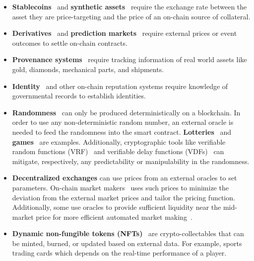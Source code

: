 \begin{itemize}

\item \textbf{Stablecoins}~\cite{clark2019sok,MSS20,PHP+19,gu2020empirical,MAKERDAOOracle} and \textbf{synthetic assets}~\cite{SCM21} require the exchange rate between the asset they are price-targeting and the price of an on-chain source of collateral. 
\item \textbf{Derivatives}~\cite{eskandari2017feasibility,biryukov2017findel,synthetix} and \textbf{prediction markets}~\cite{clark2014decentralizing,peterson2015augur} require external prices or event outcomes to settle on-chain contracts.
\item \textbf{Provenance systems}~\cite{RKYCC19,tian2016agri} require tracking information of real world assets like gold, diamonds, mechanical parts, and shipments.
\item \textbf{Identity}~\cite{KL17,maram2021candid} and other on-chain reputation systems require knowledge of governmental records to establish identities.
\item \textbf{Randomness}~\cite{chainlinkvrf} can only be produced deterministically on a blockchain. In order to use any non-deterministic random number, an external oracle is needed to feed the randomness into the smart contract. \textbf{Lotteries}~\cite{pooltogether} and \textbf{games}~\cite{etheroll} are examples. Additionally, cryptographic tools like verifiable random functions (VRF)~\cite{micali1999verifiable,goldbe-vrf-01} and verifiable delay functions (VDFs)~\cite{bunz2017proofs,crypto-2018-28858} can mitigate, respectively, any predictability or manipulability in the randomness.
\item \textbf{Decentralized exchanges} can use prices from an external oracles to set parameters. On-chain market makers~\cite{hertzog2017bancor} uses such prices to minimize the deviation from the external market prices and tailor the pricing function. Additionally, some use oracles to provide sufficient liquidity near the mid-market price for more efficient automated market making~\cite{dodopmm,cofixwhitepaper,cofixblog}.
\item \textbf{Dynamic non-fungible tokens (NFTs)}~\cite{chainlinknft} are crypto-collectables that can be minted, burned, or updated based on external data. For example, sports trading cards which depends on the real-time performance of a player.
\end{itemize}




